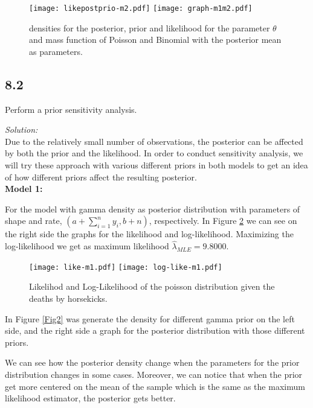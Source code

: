 \documentclass[a4paper, 11pt]{article}
\begin{document}
\begin{figure}[H]
\centering
\texttt{[image: likepostprio-m2.pdf]}
\texttt{[image: graph-m1m2.pdf]}
\caption{densities for the posterior, prior and likelihood for the parameter $\theta$ and mass function of Poisson and Binomial with the posterior mean as parameters.}
\label{Fig1b}
\end{figure}


\subsection*{8.2} Perform a prior sensitivity analysis.

\noindent
\textit{Solution:}\\

Due to the relatively small number of observations, the posterior can be affected by both the prior and the likelihood. In order to conduct sensitivity analysis, we will try these approach with various different priors in both models to get an idea of how different priors affect the resulting posterior.\\

\noindent
\textbf{Model 1:} 

For the model with gamma density as posterior distribution with parameters of shape and rate, $(a + \sum_{i=1}^{n}y_i,b + n)$, respectively.
In Figure \ref{FigLik} we can see on the right side the graphs for the likelihood and log-likelihood. Maximizing the log-likelihood we get as maximum likelihood $\hat{\lambda}_{MLE} = 9.8000$.

\begin{figure}[H]
\centering
\texttt{[image: like-m1.pdf]} 
\texttt{[image: log-like-m1.pdf]} 
\caption{Likelihod and Log-Likelihood of the poisson distribution given the deaths by horsekicks.}
\label{FigLik}
\end{figure}

In Figure \ref{Fig2} was generate the density for different gamma prior on the left side, and the right side a graph for the posterior distribution with those different priors.

We can see how the posterior density change when the parameters for the prior distribution changes in some cases. Moreover, we can notice that when the prior get more centered on the mean of the sample which is the same as the maximum likelihood estimator, the posterior gets better.
\end{document}
